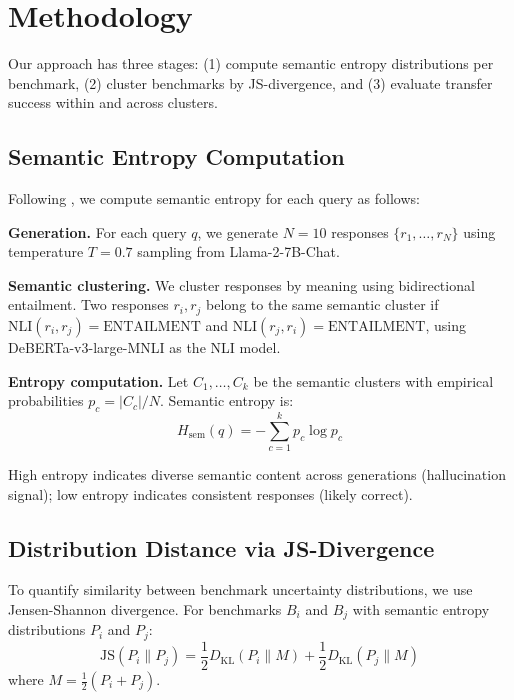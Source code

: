\section{Methodology}

Our approach has three stages: (1) compute semantic entropy distributions per benchmark, (2) cluster benchmarks by JS-divergence, and (3) evaluate transfer success within and across clusters.

\subsection{Semantic Entropy Computation}

Following \citet{kuhn2023semantic}, we compute semantic entropy for each query as follows:

\textbf{Generation.} For each query $q$, we generate $N=10$ responses $\{r_1, \ldots, r_N\}$ using temperature $T=0.7$ sampling from Llama-2-7B-Chat.

\textbf{Semantic clustering.} We cluster responses by meaning using bidirectional entailment. Two responses $r_i, r_j$ belong to the same semantic cluster if $\text{NLI}(r_i, r_j) = \text{ENTAILMENT}$ and $\text{NLI}(r_j, r_i) = \text{ENTAILMENT}$, using DeBERTa-v3-large-MNLI as the NLI model.

\textbf{Entropy computation.} Let $C_1, \ldots, C_k$ be the semantic clusters with empirical probabilities $p_c = |C_c|/N$. Semantic entropy is:
\begin{equation}
H_{\text{sem}}(q) = -\sum_{c=1}^{k} p_c \log p_c
\end{equation}

High entropy indicates diverse semantic content across generations (hallucination signal); low entropy indicates consistent responses (likely correct).

\subsection{Distribution Distance via JS-Divergence}

To quantify similarity between benchmark uncertainty distributions, we use Jensen-Shannon divergence. For benchmarks $B_i$ and $B_j$ with semantic entropy distributions $P_i$ and $P_j$:
\begin{equation}
\text{JS}(P_i \| P_j) = \frac{1}{2} D_{\text{KL}}(P_i \| M) + \frac{1}{2} D_{\text{KL}}(P_j \| M)
\end{equation}
where $M = \frac{1}{2}(P_i + P_j)$.


